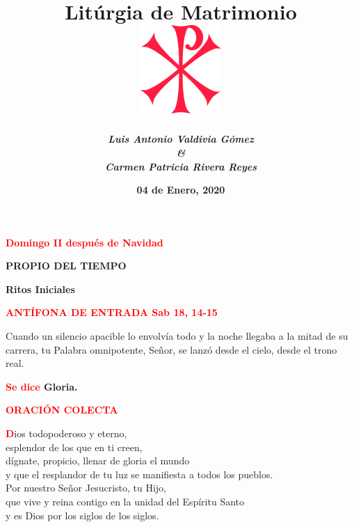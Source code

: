 \documentclass[12pt, letterpaper]{report}
\begin{document}
\title{
	\Huge \bfseries Lit\'urgia de Matrimonio \\
	\vspace{1em}
	\includegraphics{cruz_cristo}
}
\author{
	\Large \em \bfseries Luis Antonio Valdivia G\'omez \\
	\Large \em \bfseries \& \\
	\Large \em \bfseries Carmen Patricia Rivera Reyes
}
\date{\bfseries 04 de Enero, 2020}

\maketitle

\begin{center}
\Large {\bfseries \textcolor{red}{Domingo II despu\'es de Navidad}}
\end{center}

\begin{center}
\Huge {\bfseries PROPIO DEL TIEMPO} \\
\end{center}

\vspace{1cm}

\begin{center}
\Huge {\bfseries Ritos Iniciales}
\end{center}

\Large {\bfseries \textcolor{red}{ANT\'IFONA DE ENTRADA \hspace{1cm} Sab 18, 14-15} } \newline

\Large {Cuando un silencio apacible lo envolv\'ia todo y la noche llegaba a la mitad de su carrera, tu Palabra omnipotente, Se\~nor, se lanz\'o desde el cielo, desde el trono real.} \newline

\Large {\bfseries \textcolor{red}{Se dice} Gloria.} \newline

\Large {\bfseries \textcolor{red}{ORACI\'ON COLECTA}}

\lettrine[lines=1]{\bfseries \textcolor{red}{D}}{}\Large {ios todopoderoso y eterno, \\
esplendor de los que en ti creen, \\
d\'ignate, propicio, llenar de gloria el mundo \\
y que el resplandor de tu luz se manifiesta a todos los pueblos. \\
Por nuestro Se\~nor Jesucristo, tu Hijo, \\
que vive y reina contigo en la unidad del Esp\'iritu Santo \\
y es Dios por los siglos de los siglos.}
\end{document}
